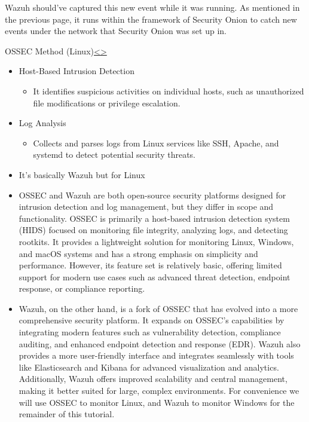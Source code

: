 \documentclass[12pt]{article}
\newenvironment{instructionblock}{\Large\bgroup}{\egroup}
\newcommand{\bi}{\begin{itemize}}
\newcommand{\ei}{\end{itemize}}
\begin{document}
Wazuh should've captured this new event while it was running. As mentioned in the previous page, it runs within the framework of Security Onion to catch new events under the network that Security Onion was set up in.



\pagebreak

\begin{slide}{OSSEC Method (Linux)}{\hyperref[slide 7]{\textless}\hyperref[slide 9]{\textgreater}}
		\vskip 10pt
	\begin{instructionblock}
		\begin{itemize}
			\item Host-Based Intrusion Detection
			\begin{itemize}
				\item It identifies suspicious activities on individual hosts, such as unauthorized file modifications or privilege escalation.
			\end{itemize}
			\item Log Analysis
			\begin{itemize}
				\item Collects and parses logs from Linux services like SSH, Apache, and systemd to detect potential security threats.
			\end{itemize}
            \item It's basically Wazuh but for Linux
		\end{itemize}
	\end{instructionblock}
\end{slide}


\vfill
\bi
\item OSSEC and Wazuh are both open-source security platforms designed for intrusion detection and log management, but they differ in scope and functionality. OSSEC is primarily a host-based intrusion detection system (HIDS) focused on monitoring file integrity, analyzing logs, and detecting rootkits. It provides a lightweight solution for monitoring Linux, Windows, and macOS systems and has a strong emphasis on simplicity and performance. However, its feature set is relatively basic, offering limited support for modern use cases such as advanced threat detection, endpoint response, or compliance reporting. 
\bigskip
\item Wazuh, on the other hand, is a fork of OSSEC that has evolved into a more comprehensive security platform. It expands on OSSEC’s capabilities by integrating modern features such as vulnerability detection, compliance auditing, and enhanced endpoint detection and response (EDR). Wazuh also provides a more user-friendly interface and integrates seamlessly with tools like Elasticsearch and Kibana for advanced visualization and analytics. Additionally, Wazuh offers improved scalability and central management, making it better suited for large, complex environments. For convenience we will use OSSEC to monitor Linux, and Wazuh to monitor Windows for the remainder of this tutorial.
\ei
\end{document}
